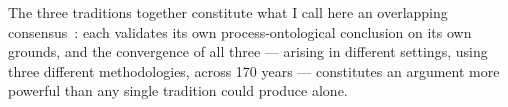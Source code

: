 The three traditions together constitute what I call here an
overlapping consensus~\citep{Rawls1993}: each validates its own
process-ontological conclusion on its own grounds, and the
convergence of all three --- arising in different settings,
using three different methodologies, across 170 years --- constitutes
an argument more powerful than any single tradition could produce alone.

